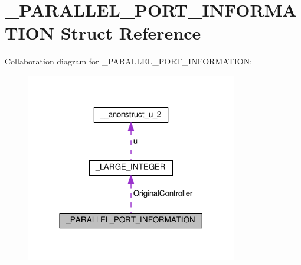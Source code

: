 \hypertarget{struct__PARALLEL__PORT__INFORMATION}{}\section{\+\_\+\+P\+A\+R\+A\+L\+L\+E\+L\+\_\+\+P\+O\+R\+T\+\_\+\+I\+N\+F\+O\+R\+M\+A\+T\+I\+O\+N Struct Reference}
\label{struct__PARALLEL__PORT__INFORMATION}


Collaboration diagram for \+\_\+\+P\+A\+R\+A\+L\+L\+E\+L\+\_\+\+P\+O\+R\+T\+\_\+\+I\+N\+F\+O\+R\+M\+A\+T\+I\+O\+N\+:
\nopagebreak
\begin{figure}[H]
\begin{center}
\leavevmode
\includegraphics[width=261pt]{struct__PARALLEL__PORT__INFORMATION__coll__graph}
\end{center}
\end{figure}
